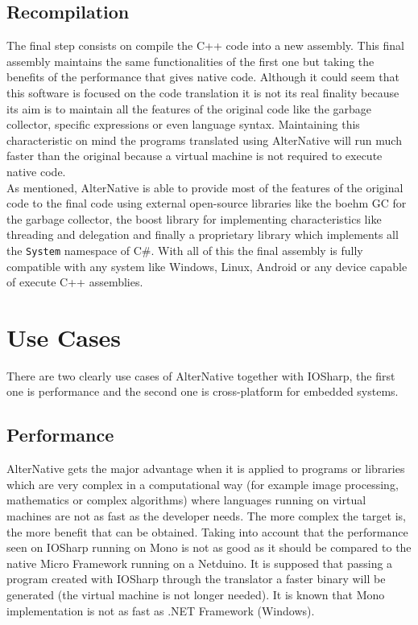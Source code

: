 \subsection{Recompilation}\label{SS:AN-Process-Recompilation}
The final step consists on compile the C++ code into a new assembly. This final assembly maintains the same functionalities of the first one but taking the benefits of the performance that gives native code. Although it could seem that this software is focused on the code translation it is not its real finality because its aim is to maintain all the features of the original code like the garbage collector, specific expressions or even language syntax. Maintaining this characteristic on mind the programs translated using AlterNative will run much faster than the original because a virtual machine is not required to execute native code.
\\
As mentioned, AlterNative is able to provide most of the features of the original code to the final code using external open-source libraries like the boehm GC for the garbage collector, the boost library for implementing characteristics like threading and delegation and finally a proprietary library which implements all the \verb!System! namespace of C\#. With all of this the final assembly is fully compatible with any system like Windows, Linux, Android or any device capable of execute C++ assemblies.

\section{Use Cases}\label{S:AN-Use-Cases}
There are two clearly use cases of AlterNative together with IOSharp, the first one is performance and the second one is cross-platform for embedded systems.
\subsection{Performance}\label{SS:AN-Use-Cases-Perf}
AlterNative gets the major advantage when it is applied to programs or libraries which are very complex in a computational way (for example image processing, mathematics or complex algorithms) where languages running on virtual machines are not as fast as the developer needs. The more complex the target is, the more benefit that can be obtained. Taking into account that the performance seen on IOSharp running on Mono is not as good as it should be compared to the native Micro Framework running on a Netduino. It is supposed that passing a program created with IOSharp through the translator a faster binary will be generated (the virtual machine is not longer needed). It is known that Mono implementation is not as fast as .NET Framework (Windows).

